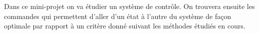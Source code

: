 \documentclass[
  french,
]{article}
\begin{document}
\def\R{\mathbb{R}}
\def\C{\mathbb{C}}

\def\L{\mathcal{L}}
\def\U{\mathcal{U}}
\newcommand{\laplace}[1]{\L^{-1}\pp{#1}}

\def\Rnn{\R^{n\times n}}

\def\ga{\gamma}
\def\eps{\varepsilon}

\def\x{x(t)}
\def\xd{\dot{x}(t)}
\def\u{u(t)}
\def\xt{\tilde{x}}
\def\xtd{\dot{\tilde{x}}}
\def\xtopt{\tilde{x}^*}
\def\Ht{\tilde{H}}
\def\ft{\tilde{f}}

\def\dt{\mathrm{d}t}
\def\ds{\mathrm{d}s}
\newcommand{\diff}[1]{\frac{\mathrm{d}}{\dt}\pp{#1}}
\newcommand{\dif}[2]{\frac{\mathrm{d}}{\mathrm{d}#2}\pp{#1}}
\newcommand{\pd}[2]{\frac{\partial#1}{\partial#2}}

\def\sgn{\mathrm{sgn}}
\newcommand{\argmin}{\mathop{\mathrm{argmin}}}
\newcommand{\argmax}{\mathop{\mathrm{argmax}}}

\newcommand{\cas}[1]{\begin{cases}#1\end{cases}}
\newcommand{\mat}[1]{\begin{matrix}#1\end{matrix}}
\newcommand{\pmat}[1]{\begin{pmatrix}#1\end{pmatrix}}
\newcommand{\bmat}[1]{\begin{bmatrix}#1\end{bmatrix}}
\newcommand{\Bmat}[1]{\begin{Bmatrix}#1\end{Bmatrix}}

\renewcommand{\Im}{\mathrm{Im}}

\newcommand{\sset}[1]{\left\{#1\right\}}
\newcommand{\pp}[1]{\left(#1\right)}

\newcommand{\vset}[2]{\sset{#1\left\lvert\mat{#2}\right.}}

\newcommand{\norm}[1]{\left\lVert#1\right\rVert}
\newcommand{\abs}[1]{\left\lvert#1\right\rvert}
\newcommand{\dotp}[2]{\left\langle#1{,}#2\right\rangle}

\newcommand{\qtext}[1]{\quad\text{#1}\quad}
\newcommand{\qou}{\quad\mathrm{o\grave{u}}\quad}

\newcommand{\transp}[1]{{#1}^{\top}}

Dans ce mini-projet on va étudier un système de contrôle.
On trouvera ensuite les commandes qui permettent d'aller
d'un état à l'autre du système de façon optimale
par rapport à un critère donné suivant les méthodes
étudiés en cours.
\end{document}
